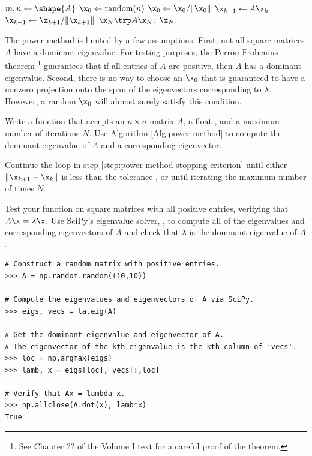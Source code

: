 \begin{algorithm}[H] %
\begin{algorithmic}[1]
    \State $m, n \gets \shape{A}$
    \State $\x_0 \gets \text{random}(n)$
    \State $\x_0 \gets \x_0/\|\x_0\|$
        \label{step:power-method-stopping-criterion}
        \State $\x_{k+1} \gets A\x_k$
        \State $\x_{k+1} \gets \x_{k+1}/\|\x_{k+1}\|$
    \EndFor
    \State {} $\x_N\trp A \x_N,\ \x_N$
\EndProcedure
\end{algorithmic}
\caption{}
\label{Alg:power-method}
\end{algorithm}

The power method is limited by a few assumptions.
First, not all square matrices $A$ have a dominant eigenvalue.
For testing purposes, the Perron-Frobenius theorem%
\footnote{See Chapter ?? of the Volume I text for a careful proof of the theorem.}
guarantees that if all entries of $A$ are positive, then $A$ has a dominant eigenvalue.
Second, there is no way to choose an $\x_0$ that is guaranteed to have a nonzero projection onto the span of the eigenvectors corresponding to $\lambda$.
However, a random $\x_0$ will almost surely satisfy this condition.


\begin{problem} %
Write a function that accepts an $n \times n$ matrix $A$, a float , and a maximum number of iterations $N$.
Use Algorithm \ref{Alg:power-method} to compute the dominant eigenvalue of $A$ and a corresponding eigenvector.

Continue the loop in step \ref{step:power-method-stopping-criterion} until either $\|\x_{k+1} - \x_k\|$ is less than the tolerance , or until iterating the maximum number of times $N$.

Test your function on square matrices with all positive entries, verifying that $A\x = \lambda\x$.
Use SciPy's eigenvalue solver, , to compute all of the eigenvalues and corresponding eigenvectors of $A$ and check that $\lambda$ is the dominant eigenvalue of $A$.

\begin{lstlisting}
# Construct a random matrix with positive entries.
>>> A = np.random.random((10,10))

# Compute the eigenvalues and eigenvectors of A via SciPy.
>>> eigs, vecs = la.eig(A)

# Get the dominant eigenvalue and eigenvector of A.
# The eigenvector of the kth eigenvalue is the kth column of 'vecs'.
>>> loc = np.argmax(eigs)
>>> lamb, x = eigs[loc], vecs[:,loc]

# Verify that Ax = lambda x.
>>> np.allclose(A.dot(x), lamb*x)
True
\end{lstlisting}
\end{problem}

